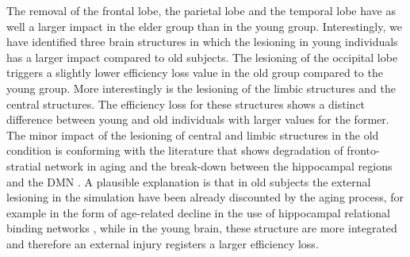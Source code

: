 \documentclass[12pt,a4paper]{article}
\begin{document}
The removal of the frontal lobe, the parietal lobe and the temporal lobe have as well a larger impact in the elder group than in the young group. 
Interestingly, we have identified three brain structures in which the lesioning in young individuals has a larger impact compared to old subjects. The lesioning of the occipital lobe triggers a slightly lower efficiency loss value in the old group compared to the young group. More interestingly is the lesioning of the limbic structures and the central structures. The efficiency loss for these structures shows a distinct difference between young and old individuals with larger values for the former. The minor impact of the lesioning of central and limbic structures in the old condition is conforming with the literature that shows degradation of fronto-stratial network in aging \citep{salami_elevated_2014} and the break-down between the hippocampal regions and the DMN \citep{fjell_brain_2015}. 
A plausible explanation is that in old subjects the external lesioning in the simulation have been already discounted by the aging process, for example in the form of age-related decline in the use of hippocampal relational binding networks \citep{rondina_ii_age-related_2015}, while in the young brain, these structure are more integrated and therefore an external injury registers a larger efficiency loss.  
\end{document}
